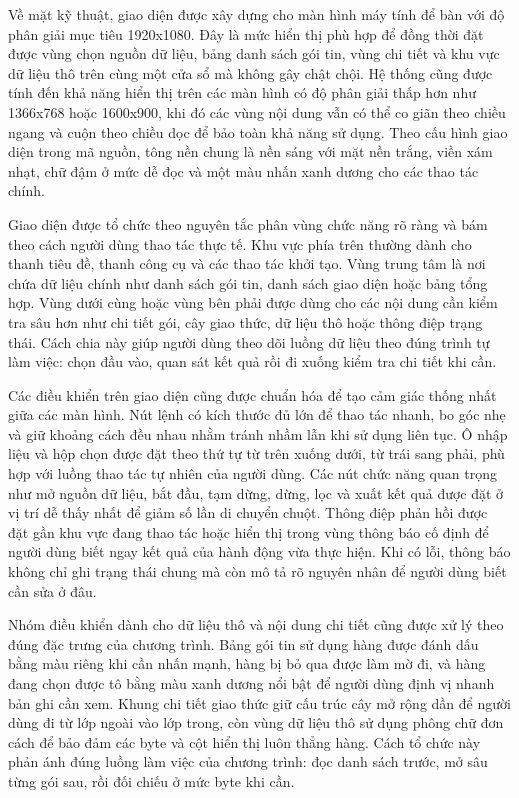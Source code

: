 \documentclass[../DoAn.tex]{subfiles}
\begin{document}
Về mặt kỹ thuật, giao diện được xây dựng cho màn hình máy tính để bàn với độ phân giải mục tiêu 1920x1080. Đây là mức hiển thị phù hợp để đồng thời đặt được vùng chọn nguồn dữ liệu, bảng danh sách gói tin, vùng chi tiết và khu vực dữ liệu thô trên cùng một cửa sổ mà không gây chật chội. Hệ thống cũng được tính đến khả năng hiển thị trên các màn hình có độ phân giải thấp hơn như 1366x768 hoặc 1600x900, khi đó các vùng nội dung vẫn có thể co giãn theo chiều ngang và cuộn theo chiều dọc để bảo toàn khả năng sử dụng. Theo cấu hình giao diện trong mã nguồn, tông nền chung là nền sáng với mặt nền trắng, viền xám nhạt, chữ đậm ở mức dễ đọc và một màu nhấn xanh dương cho các thao tác chính. 

Giao diện được tổ chức theo nguyên tắc phân vùng chức năng rõ ràng và bám theo cách người dùng thao tác thực tế. Khu vực phía trên thường dành cho thanh tiêu đề, thanh công cụ và các thao tác khởi tạo. Vùng trung tâm là nơi chứa dữ liệu chính như danh sách gói tin, danh sách giao diện hoặc bảng tổng hợp. Vùng dưới cùng hoặc vùng bên phải được dùng cho các nội dung cần kiểm tra sâu hơn như chi tiết gói, cây giao thức, dữ liệu thô hoặc thông điệp trạng thái. Cách chia này giúp người dùng theo dõi luồng dữ liệu theo đúng trình tự làm việc: chọn đầu vào, quan sát kết quả rồi đi xuống kiểm tra chi tiết khi cần.

Các điều khiển trên giao diện cũng được chuẩn hóa để tạo cảm giác thống nhất giữa các màn hình. Nút lệnh có kích thước đủ lớn để thao tác nhanh, bo góc nhẹ và giữ khoảng cách đều nhau nhằm tránh nhầm lẫn khi sử dụng liên tục. Ô nhập liệu và hộp chọn được đặt theo thứ tự từ trên xuống dưới, từ trái sang phải, phù hợp với luồng thao tác tự nhiên của người dùng. Các nút chức năng quan trọng như mở nguồn dữ liệu, bắt đầu, tạm dừng, dừng, lọc và xuất kết quả được đặt ở vị trí dễ thấy nhất để giảm số lần di chuyển chuột. Thông điệp phản hồi được đặt gần khu vực đang thao tác hoặc hiển thị trong vùng thông báo cố định để người dùng biết ngay kết quả của hành động vừa thực hiện. Khi có lỗi, thông báo không chỉ ghi trạng thái chung mà còn mô tả rõ nguyên nhân để người dùng biết cần sửa ở đâu.

Nhóm điều khiển dành cho dữ liệu thô và nội dung chi tiết cũng được xử lý theo đúng đặc trưng của chương trình. Bảng gói tin sử dụng hàng được đánh dấu bằng màu riêng khi cần nhấn mạnh, hàng bị bỏ qua được làm mờ đi, và hàng đang chọn được tô bằng màu xanh dương nổi bật để người dùng định vị nhanh bản ghi cần xem. Khung chi tiết giao thức giữ cấu trúc cây mở rộng dần để người dùng đi từ lớp ngoài vào lớp trong, còn vùng dữ liệu thô sử dụng phông chữ đơn cách để bảo đảm các byte và cột hiển thị luôn thẳng hàng. Cách tổ chức này phản ánh đúng luồng làm việc của chương trình: đọc danh sách trước, mở sâu từng gói sau, rồi đối chiếu ở mức byte khi cần.
\end{document}
